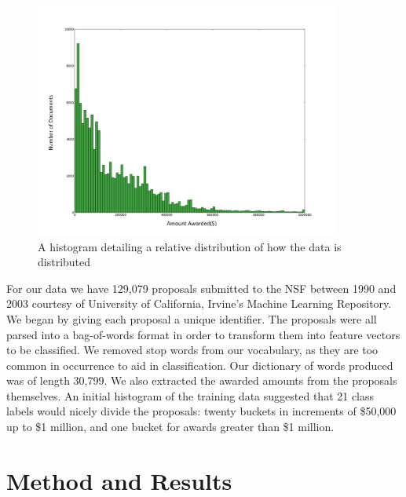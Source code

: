 \documentclass{sig-alternate}
\begin{document}
\begin{figure}[h]
\centering
\includegraphics[width=100mm]{histo_pretty.png}
\caption{A histogram detailing a relative distribution of how the data is distributed}
\end{figure}

For our data we have 129,079 proposals submitted to the NSF between 1990 and 2003 courtesy of University of California, Irvine’s Machine Learning Repository. We began by giving each proposal a unique identifier. The proposals were all parsed into a bag-of-words format in order to transform them into feature vectors to be classified.  We removed stop words from our vocabulary, as they are too common in occurrence to aid in classification.  Our dictionary of words produced was of length 30,799.  We also extracted the awarded amounts from the proposals themselves.  An initial histogram of the training data suggested that 21 class labels would nicely divide the proposals: twenty buckets in increments of \$50,000 up to \$1 million, and one bucket for awards greater than \$1 million.

\section{Method and Results}
\end{document}
